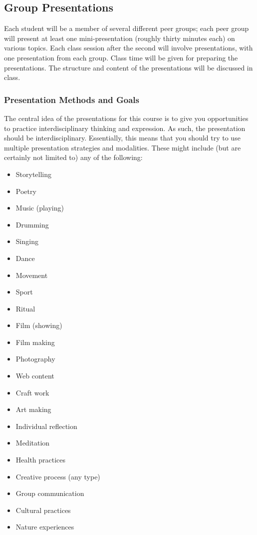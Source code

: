 \documentclass[letterpaper,10pt,headsepline]{scrreprt}
\begin{document}
\subsection{Group Presentations}

Each student will be a member of several different peer groups; each
peer group will present at least one mini-presentation (roughly thirty minutes each) on various topics. Each class session after the second will involve presentations, with one presentation from each group. Class time will be given for preparing the presentations. The structure and content of the presentations will be discussed in class.

\subsubsection{Presentation Methods and Goals}

The central idea of the presentations for this course is to give you
 opportunities to practice interdisciplinary thinking and expression.
 As such, the presentation should be interdisciplinary. Essentially,
 this means that you should try to use multiple presentation
 strategies and modalities. These might include (but are certainly not
 limited to) any of the following:

 \begin{itemize}
 \item Storytelling
 \item Poetry
 \item Music (playing)
 \item Drumming
 \item Singing
 \item Dance
 \item Movement
 \item Sport
 \item Ritual
 \item Film (showing)
 \item Film making
 \item Photography
 \item Web content
 \item Craft work
 \item Art making
 \item Individual reflection
 \item Meditation
 \item Health practices
 \item Creative process (any type)
 \item Group communication
 \item Cultural practices
 \item Nature experiences
 \end{itemize}
\end{document}
